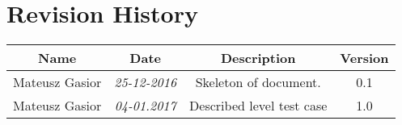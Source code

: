 \chapter*{Revision History}

\begin{center}
    \begin{tabular}{|c|c|c|c|}
        \hline
	    Name & Date & Description & Version\\ \hline
	    Mateusz Gasior & \emph{25-12-2016} & Skeleton of document. & 0.1 \\ \hline
	    Mateusz Gasior & \emph{04-01.2017} & Described level test case & 1.0 \\
        \hline
    \end{tabular}
\end{center}

